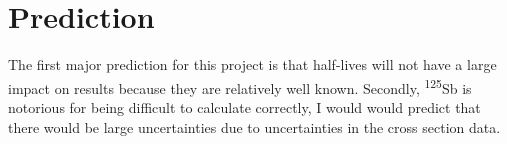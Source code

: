 \documentclass[11pt,notitlepage]{article}
\newcommand{\tss}{\textsuperscript}
\begin{document}

\section{Prediction}

The first major prediction for this project is that half-lives
will not have a large impact on results because they are
relatively well known. Secondly, \tss{125}Sb is notorious
for being difficult to calculate correctly, I would would predict that
there would be large uncertainties due to uncertainties in
the cross section data.



\end{document}
